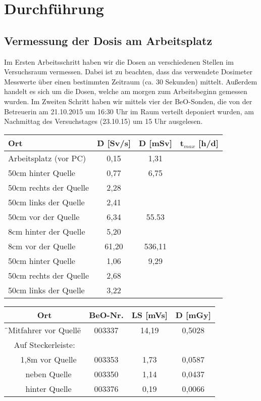 \section{Durchführung}

\subsection{Vermessung der Dosis am Arbeitsplatz}
Im Ersten Arbeitsschritt haben wir die Dosen an verschiedenen Stellen im Versuchsraum vermessen. Dabei ist zu beachten, dass das verwendete Dosimeter Messwerte über einen bestimmten Zeitraum (ca. 30 Sekunden) mittelt. Außerdem handelt es sich um die Dosen, welche am morgen zum Arbeitsbeginn gemessen wurden. %
Im Zweiten Schritt haben wir mittels vier der BeO-Sonden, die von der Betreuerin am 21.10.2015 um 16:30 Uhr im Raum verteilt deponiert wurden, am Nachmittag des Versuchstages (23.10.15) um 15 Uhr ausgelesen.  %

	\begin{center}	

					\begin{tabular}{l|c|c|c}
								\textbf{Ort} & \textbf{\.D} [Sv/s] & \textbf{D} [mSv]  & \textbf{t$_{max}$} [h/d]\\ 
						\hline  Arbeitsplatz (vor PC) & 0,15  & 1,31   & \\ 
								50cm hinter Quelle    & 0,77  & 6,75   & \\ 
								50cm rechts der Quelle& 2,28  &        &\\ 
								50cm links der Quelle & 2,41  &        &\\ 
								50cm vor der Quelle   & 6,34  & 55.53  & \\ 
								8cm hinter der Quelle & 5,20  &        &\\ 
								8cm vor der Quelle    & 61,20 & 536,11 & \\
						\hline  50cm hinter Quelle    & 1,06  & 9,29   & \\
								50cm rechts der Quelle& 2,68  &        &\\ 
								50cm links der Quelle & 3,22  &        &\\
					\end{tabular}	
	
					\begin{tabular}{c|c|c|c}
								\textbf{Ort} & \textbf{BeO-Nr.} & \textbf{LS} [mVs] & \textbf{D} [mGy] \\
						\hline  \"{}Mitfahrer vor Quelle\" & 003337 & 14,19 & 0,5028 \\
								Auf Steckerleiste:         &        &       &        \\
								 \ \ 1,8m vor Quelle       & 003353 & 1,73  & 0,0587 \\
								 \ \ neben Quelle          & 003350 & 1,14  & 0,0437 \\
								 \ \ hinter Quelle         & 003376 & 0,19  & 0,0066 \\
						
					\end{tabular}
	\end{center}
	
